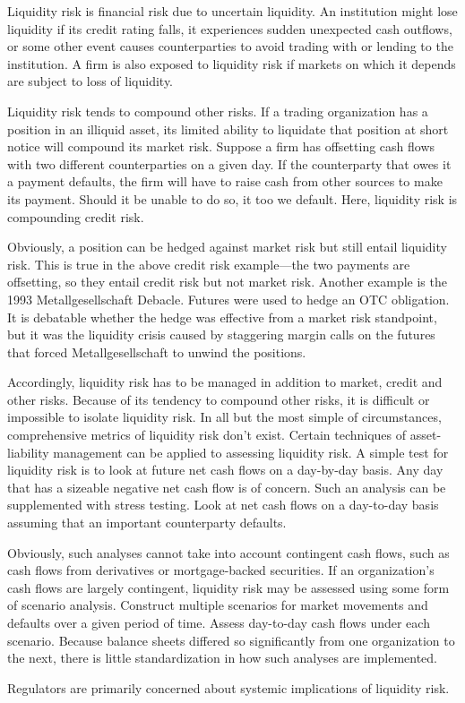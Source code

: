 \documentclass[]{report}
\begin{document}
 Liquidity risk is financial risk due to uncertain liquidity. An institution might lose liquidity if its credit rating falls, it experiences sudden unexpected cash outflows, or some other event causes counterparties to avoid trading with or lending to the institution. A firm is also exposed to liquidity risk if markets on which it depends are subject to loss of liquidity.
 
 Liquidity risk tends to compound other risks. If a trading organization has a position in an illiquid asset, its limited ability to liquidate that position at short notice will compound its market risk. Suppose a firm has offsetting cash flows with two different counterparties on a given day. If the counterparty that owes it a payment defaults, the firm will have to raise cash from other sources to make its payment. Should it be unable to do so, it too we default. Here, liquidity risk is compounding credit risk.
 
 Obviously, a position can be hedged against market risk but still entail liquidity risk. This is true in the above credit risk example—the two payments are offsetting, so they entail credit risk but not market risk. Another example is the 1993 Metallgesellschaft Debacle. Futures were used to hedge an OTC obligation. It is debatable whether the hedge was effective from a market risk standpoint, but it was the liquidity crisis caused by staggering margin calls on the futures that forced Metallgesellschaft to unwind the positions.
 
  
 
    
 Accordingly, liquidity risk has to be managed in addition to market, credit and other risks. Because of its tendency to compound other risks, it is difficult or impossible to isolate liquidity risk. In all but the most simple of circumstances, comprehensive metrics of liquidity risk don't exist. Certain techniques of asset-liability management can be applied to assessing liquidity risk. A simple test for liquidity risk is to look at future net cash flows on a day-by-day basis. Any day that has a sizeable negative net cash flow is of concern. Such an analysis can be supplemented with stress testing. Look at net cash flows on a day-to-day basis assuming that an important counterparty defaults.
 
 Obviously, such analyses cannot take into account contingent cash flows, such as cash flows from derivatives or mortgage-backed securities. If an organization's cash flows are largely contingent, liquidity risk may be assessed using some form of scenario analysis. Construct multiple scenarios for market movements and defaults over a given period of time. Assess day-to-day cash flows under each scenario. Because balance sheets differed so significantly from one organization to the next, there is little standardization in how such analyses are implemented.
 
 Regulators are primarily concerned about systemic implications of liquidity risk.
 
 
 
\end{document}
